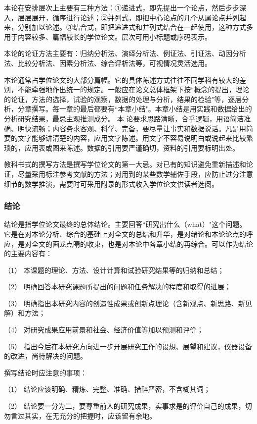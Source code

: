 本论在安排层次上主要有三种方法：①递进式，即先提出一个论点，然后步步深入，层层展开，循序进行论述；②并列式，即把中心论点的几个从属论点并列起来，分别加以论述。③结合式，即把递进式和并列式结合在一起使用，这种方式多用于内容较多、篇幅较长的学位论文。层次可用小标题或序码表示。

本论的论证方法主要有：归纳分析法、演绎分析法、例证法、引证法、动因分析法、比较分析法、因素分析法、综合评析法等，可视情况灵活选用。

本论通常占学位论文的大部分篇幅。它的具体陈述方式往往不同学科有较大的差别，不能牵强地作出统一的规定。一般应在论文总体框架下按``概念的提出，理论的论证，方法的选择，试验的观察，数据的处理与分析，结果的检验"等，逐层分析，分章撰写。每一章的最后都要有``本章小结"。本章小结是用实践和数据给出的分析研究结果，最忌主观推测成分。
本
论要求思路清晰，合乎逻辑，用语简洁准确、明快流畅；内容务求客观、科学、完备，要尽量让事实和数据说话。凡是用简要的文字能够讲清楚的内容，应用文字陈述。用文字不容易说明白或说起来比较繁琐的，应用表或图来陈述。数据的引用要严谨确切，资料的引用要标明出处。

教科书式的撰写方法是撰写学位论文的第一大忌。对已有的知识避免重新描述和论证，尽量采用标注参考文献的方法；对用到的某些数学辅佐手段，应防止过分注意细节的数学推演，需要时可采用附录的形式收入学位论文供读者选阅。

\subsubsection{结论}\label{appendixA-6-1-3} 
结论是指学位论文最终的总体结论。主要回答``研究出什么（what）"这个问题。它是在对本论分析、综合的基础上对全文的总结和升华，是对绪论和本论论点的呼应，是对全文的画龙点睛的收束，也是对本论中各章小结的再综合。可以作为结论的主要内容有：

（1）	本课题的理论、方法、设计计算和试验研究结果等的归纳和总结；

（2）	明确回答本研究课题所提出的问题和任务解决的程度和取得的进展；

（3）	明确指出本研究内容的创造性成果或创新点理论（含新观点、新思路、新见解）和方法；

（4）	对研究成果应用前景和社会、经济价值等加以预测和评价；

（5）	指出今后在本研究方向进一步开展研究工作的设想、展望和建议，仪器设备的改进，尚待解决的问题。

撰写结论时应注意的事项：

（1）	结论应该明确、精炼、完整、准确、措辞严密，不含糊其词；

（2）	结论要一分为二，要尊重前人的研究成果，实事求是的评价自己的成果，切勿言过其实，在无充分的把握时，应该留有余地。

